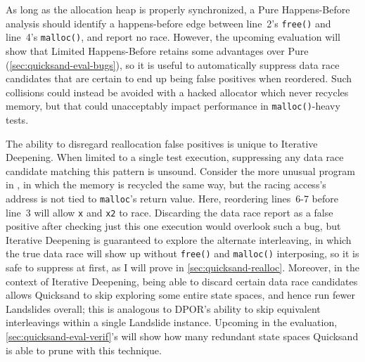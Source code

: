 As long as the allocation heap is properly synchronized,
a Pure Happens-Before analysis should identify a happens-before edge
between line~2's {\tt free()} and line~4's {\tt malloc()},
and report no race.
However, the upcoming evaluation will show that Limited Happens-Before retains some advantages over Pure
(\cref{sec:quicksand-eval-bugs}),
so it is useful to
automatically suppress data race candidates
that are certain to end up being false positives when reordered.
Such collisions could instead be avoided with a hacked allocator which never recycles memory,
but that could unacceptably impact performance in {\tt malloc()}-heavy tests.

The ability to disregard reallocation false positives is unique to Iterative Deepening.
When limited to a single test execution, suppressing any data race candidate matching this pattern is unsound.
Consider the more unusual program in ,
in which the memory is recycled the same way, but the racing access's address is not tied to {\tt malloc}'s return value.
Here, reordering lines~6-7 before line~3 will allow {\tt x} and {\tt x2} to race.
Discarding the data race report as a false positive after checking just this one execution
would overlook such a bug,
but Iterative Deepening is guaranteed to explore the alternate interleaving,
in which the true data race will show up without {\tt free()} and {\tt malloc()} interposing,
so it is safe to suppress at first, as I will prove in \cref{sec:quicksand-realloc}.
Moreover,
in the context of Iterative Deepening, being able to discard certain data race candidates
allows Quicksand to skip exploring some entire state spaces,
and hence run fewer Landslides overall;
this is analogous to DPOR's ability to skip equivalent interleavings within a single Landslide instance.
Upcoming in the evaluation, \cref{sec:quicksand-eval-verif}'s 
will show how many redundant state spaces Quicksand is able to prune with this technique.

